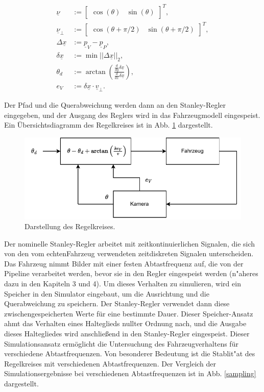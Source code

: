 \documentclass[arbeit=studie,oneside,BCOR=12mm]{ArbeitRST}
\begin{document}
\begin{subequations}
\begin{align}
    \underline{\nu} &:= \begin{bmatrix} \cos(\theta) & \sin(\theta) \end{bmatrix}^T, \\
        \underline{\nu}_{\perp} &:= \begin{bmatrix} \cos(\theta + \pi/2) & \sin(\theta + \pi/2) \end{bmatrix}^T, \\
    \Delta\underline{x} &:= \underline{p}_V - \underline{p}_P, \\
    \delta\underline{x} &:= \min  || \Delta\underline{x} ||_2, \\
    \theta_d &:= \arctan\left(\frac{\frac{d}{dy}\delta\underline{x}}{\frac{d}{dx}\delta\underline{x}}\right), \\
    e_{V} &:= \delta\underline{x} \cdot \underline{v}_{\perp}.
 \label{alg:quer}
\end{align}
\end{subequations}

Der Pfad und die Querabweichung werden dann an den Stanley-Regler eingegeben,
und der Ausgang des Reglers wird in das Fahrzeugmodell eingespeist. Ein
Übersichtsdiagramm des Regelkreises ist in Abb. \ref{control_loop} dargestellt.

\begin{figure}[h]
    \centering
    \includegraphics{control_loop}
    \caption{Darstellung des Regelkreises.}
    \label{control_loop}
\end{figure}

Der nominelle Stanley-Regler arbeitet mit zeitkontinuierlichen Signalen, die sich von den
vom \glqq echten\grqq Fahrzeug verwendeten zeitdiskreten Signalen
unterscheiden. Das Fahrzeug nimmt Bilder mit einer festen Abtastfrequenz auf,
die von der Pipeline verarbeitet werden, bevor sie in den Regler eingespeist
werden (n"aheres dazu in den Kapiteln 3 und 4). Um dieses Verhalten zu simulieren, wird ein Speicher in den Simulator
eingebaut, um die Ausrichtung und die Querabweichung zu speichern. Der
Stanley-Regler verwendet dann diese zwischengespeicherten Werte für eine
bestimmte Dauer. Dieser Speicher-Ansatz ahmt das Verhalten eines Halteglieds
nullter Ordnung nach, und die Ausgabe dieses Haltegliedes wird anschließend in
den Stanley-Regler eingespeist. Dieser Simulationsansatz ermöglicht die
Untersuchung des Fahrzeugverhaltens für verschiedene Abtastfrequenzen. Von
besonderer Bedeutung ist die Stablit"at des Regelkreises mit verschiedenen
Abtastfrequenzen. Der Vergleich der Simulationsergebnisse bei
verschiedenen Abtastfrequenzen ist in Abb. \ref{sampling} dargestellt. 
\end{document}
